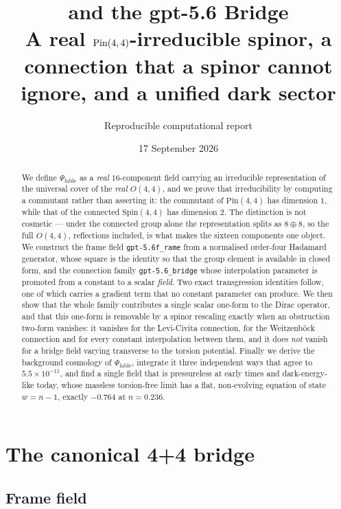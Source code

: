 \documentclass[11pt]{article}
\title{\texorpdfstring{\fableSpinor}{fableSpinor} and the gpt-5.6 Bridge\\
\large A real $\Pin(4,4)$-irreducible spinor, a connection that a spinor cannot
ignore, and a unified dark sector}
\author{Reproducible computational report}
\date{17 September 2026}
\newcommand{\fableSpinor}{\ensuremath{\Psi_{\mathrm{fable}}}}
\newcommand{\Pin}{\mathrm{Pin}}
\newcommand{\Spin}{\mathrm{Spin}}
\begin{document}
\maketitle

\begin{abstract}
We define \fableSpinor{} as a \emph{real} $16$-component field carrying an
irreducible representation of the universal cover of the \emph{real} $O(4,4)$,
and we prove that irreducibility by computing a commutant rather than asserting
it: the commutant of $\Pin(4,4)$ has dimension $1$, while that of the connected
$\Spin(4,4)$ has dimension $2$. The distinction is not cosmetic --- under the
connected group alone the representation splits as $8\oplus8$, so the full
$O(4,4)$, reflections included, is what makes the sixteen components one object.
We construct the frame field \texttt{gpt-5.6f\_rame} from a normalised order-four
Hadamard generator, whose square is the identity so that the group element is
available in closed form, and the connection family \texttt{gpt-5.6\_bridge}
whose interpolation parameter is promoted from a constant to a scalar
\emph{field}. Two exact transgression identities follow, one of which carries a
gradient term that no constant parameter can produce. We then show that the
whole family contributes a single scalar one-form to the Dirac operator, and
that this one-form is removable by a spinor rescaling exactly when an
obstruction two-form vanishes: it vanishes for the Levi-Civita connection, for
the Weitzenb\"ock connection and for every constant interpolation between them,
and it does \emph{not} vanish for a bridge field varying transverse to the
torsion potential. Finally we derive the background cosmology of \fableSpinor{},
integrate it three independent ways that agree to $5.5\times10^{-11}$, and find
a single field that is pressureless at early times and dark-energy-like today,
whose massless torsion-free limit has a flat, non-evolving equation of state
$w=n-1$, exactly $-0.764$ at $n=0.236$.
\end{abstract}

\tableofcontents

\section{The canonical 4+4 bridge}

\subsection{Frame field}
\end{document}
